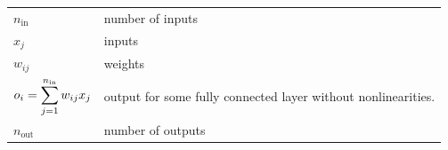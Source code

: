 \begin{customTableWrapper}{1.5}
\begin{table}[H]
    \centering
    \begin{tabular}{l p{8cm}}
        $n_\textrm{in}$ & number of inputs \\

        $x_j$ & inputs \\

        $w_{ij}$ & weights \\
        
        $o_{i} = \displaystyle\sum_{j=1}^{n_\textrm{in}} w_{ij} x_j$ & output for some fully connected layer without nonlinearities. \\[1ex]

        $n_\textrm{out}$ & number of outputs \\
    \end{tabular}
\end{table}
\end{customTableWrapper}

